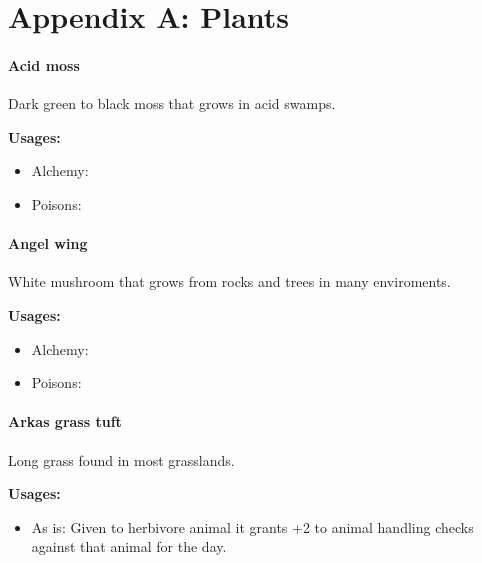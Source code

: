\chapter*{Appendix A: Plants}

\subsubsection{Acid moss}
\label{Acid moss}

Dark green to black moss that grows in acid swamps.

\vspace{5mm}

\textbf{Usages:}

\begin{itemize}[noitemsep]
\item[] Alchemy: \earth\water
\item[] Poisons: \poison
\end{itemize}

\subsubsection{Angel wing}
\label{Angel wing}

White mushroom that grows from rocks and trees in many enviroments.

\vspace{5mm}

\textbf{Usages:}

\begin{itemize}[noitemsep]
\item[] Alchemy: \air\earth
\item[] Poisons: \poison
\end{itemize}

\subsubsection{Arkas grass tuft}
\label{Arkas grass tuft}

Long grass found in most grasslands.

\vspace{5mm}

\textbf{Usages:}

\begin{itemize}[noitemsep]
\item[] As is: Given to herbivore animal it grants +2 to animal handling checks against that animal for the day.
\end{itemize}

